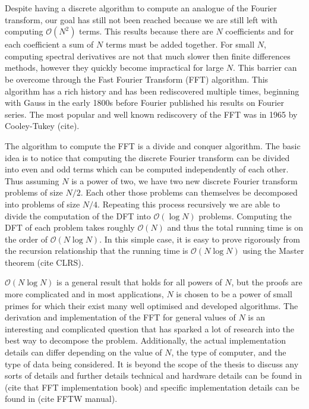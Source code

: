 Despite having a discrete algorithm to compute an analogue of the Fourier transform, our goal has still not been reached because we are still left with computing $\mathcal{O}(N^{2})$ terms. This results because there are $N$ coefficients and for each coefficient a sum of $N$ terms must be added together. For small $N$, computing spectral derivatives are not that much slower then finite differences methods, however they quickly become impractical for large $N$. This barrier can be overcome through the Fast Fourier Transform (FFT) algorithm. This algorithm has a rich history and has been rediscovered multiple times, beginning with Gauss in the early 1800s before Fourier published his results on Fourier series. The most popular and well known rediscovery of the FFT was in 1965 by Cooley-Tukey (cite).

The algorithm to compute the FFT is a divide and conquer algorithm. The basic idea is to notice that computing the discrete Fourier transform can be divided into even and odd terms which can be computed independently of each other. Thus assuming $N$ is a power of two, we have two new discrete Fourier transform problems of size $N/2$. Each other those problems can themselves be decomposed into problems of size $N/4$. Repeating this process recursively we are able to divide the computation of the DFT into $\mathcal{O}(\log N)$ problems. Computing the DFT of each problem takes roughly $\mathcal{O}(N)$ and thus the total running time is on the order of $\mathcal{O}(N\log N)$. In this simple case, it is easy to prove rigorously from the recursion relationship that the running time is $\mathcal{O}(N\log N)$ using the Master theorem (cite CLRS). 

$\mathcal{O}(N\log N)$ is a general result that holds for all powers of $N$, but the proofs are more complicated and in most applications, $N$ is chosen to be a power of small primes for which their exist many well optimised and developed algorithms. The derivation and implementation of the FFT for general values of $N$ is an interesting and complicated question that has sparked a lot of research into the best way to decompose the problem. Additionally, the actual implementation details can differ depending on the value of $N$, the type of computer, and the type of data being considered. It is beyond the scope of the thesis to discuss any sorts of details and further details technical and hardware details can be found in (cite that FFT implementation book) and specific implementation details can be found in (cite FFTW manual).

